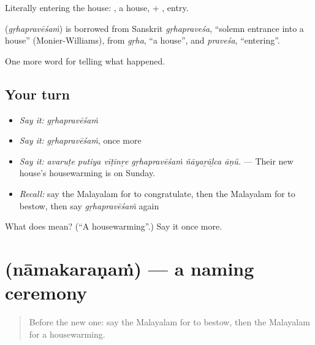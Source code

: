 Literally entering the house: , a house, + , entry.

\begin{cousinweb}
\textbf{} (\emph{gṛhapravēśaṁ}) is borrowed from Sanskrit \emph{gṛhapraveśa}, \textquotedblleft{}solemn entrance into a house\textquotedblright{} (Monier-Williams), from \emph{gṛha}, \textquotedblleft{}a house\textquotedblright{}, and \emph{praveśa}, \textquotedblleft{}entering\textquotedblright{}.
\end{cousinweb}

\begin{grammarlens}[title={What you've built}]
One more word for telling what happened.
\end{grammarlens}

\subsection*{Your turn}
\begin{itemize}
\raggedright
  \item \emph{Say it:} \emph{gṛhapravēśaṁ}
  \item \emph{Say it:} \emph{gṛhapravēśaṁ}, once more
  \item \emph{Say it:} \emph{avaruṭe putiya vīṭinṟe gṛhapravēśaṁ ñāyaṟāḻca āṇŭ.} — Their new house's housewarming is on Sunday.
  \item \emph{Recall:} say the Malayalam for to congratulate, then the Malayalam for to bestow, then say \emph{gṛhapravēśaṁ} again
\end{itemize}

\begin{tcolorbox}[breakable,colback=teal!4,colframe=teal!35!black,title={Before you move on}]
What does  mean? (\textquotedblleft{}A housewarming\textquotedblright{}.) Say it once more.
\end{tcolorbox}
\section[\texorpdfstring{\ml{നാമകരണം} (nāmakaraṇaṁ)}{നാമകരണം (nāmakaraṇaṁ)}]{ (nāmakaraṇaṁ) — a naming ceremony}

\label{lesson:ML-C389-namakaranam}



\begin{quote}
Before the new one: say the Malayalam for to bestow, then the Malayalam for a housewarming.
\end{quote}

